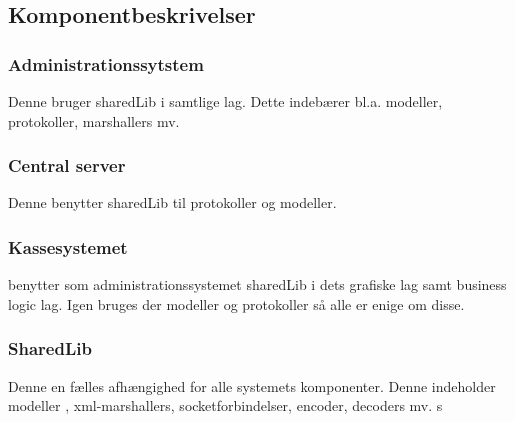 \subsection{Komponentbeskrivelser}

\subsubsection{Administrationssytstem} Denne bruger sharedLib i samtlige lag. Dette indebærer bl.a. modeller, protokoller, marshallers mv.

\subsubsection{Central server} Denne benytter sharedLib til protokoller og modeller.

\subsubsection{Kassesystemet} benytter som administrationssystemet sharedLib i dets grafiske lag samt business logic lag. Igen bruges der modeller og protokoller så alle er enige om disse.

\subsubsection{SharedLib}
Denne en fælles afhængighed for alle systemets komponenter. Denne indeholder modeller
, xml-marshallers, socketforbindelser, encoder, decoders mv. s